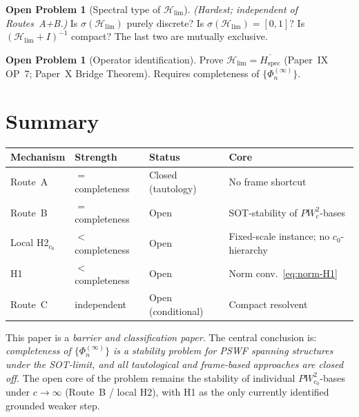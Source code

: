 \documentclass[12pt,a4paper]{amsart}
\theoremstyle{definition}
\newtheorem{problem}[theorem]{Open Problem}
\theoremstyle{remark}
\newcommand{\Hlim}{\mathcal{H}_{\lim}}
\newcommand{\Phiinf}[1]{\Phi_{#1}^{(\infty)}}
\newcommand{\PW}{PW}
\newcommand{\spc}[1]{\sigma(#1)}
\begin{document}
\begin{problem}[Spectral type of $\Hlim$]
\label{prob:spectral-type}
\emph{(Hardest; independent of Routes~A+B.)}
Is $\spc{\Hlim}$ purely discrete?
Is $\spc{\Hlim}=[0,1]$?
Is $(\Hlim+I)^{-1}$ compact?
The last two are mutually exclusive.
\end{problem}

\begin{problem}[Operator identification]
\label{prob:bridge}
Prove $\Hlim = \overline{H_{\mathrm{spec}}}$
(Paper~IX OP~7; Paper~X Bridge Theorem).
Requires completeness of $\{\Phiinf{n}\}$.
\end{problem}

\section{Summary}
\label{sec:summary}

\medskip
\begin{center}
\renewcommand{\arraystretch}{1.3}
\begin{tabular}{lllp{3.5cm}}
\toprule
Mechanism & Strength & Status & Core \\
\midrule
Route~A & $=$ completeness
  & Closed (tautology)
  & No frame shortcut \\
Route~B & $=$ completeness
  & Open
  & SOT-stability of $\PW_c^2$-bases \\
Local H2$_{c_0}$ & $<$ completeness
  & Open
  & Fixed-scale instance; no $c_0$-hierarchy \\
H1 & $<$ completeness
  & Open
  & Norm conv.\ \eqref{eq:norm-H1} \\
Route~C & independent
  & Open (conditional)
  & Compact resolvent \\
\bottomrule
\end{tabular}
\end{center}

\medskip
\noindent
This paper is a \emph{barrier and classification paper}.
The central conclusion is:
\emph{completeness of $\{\Phiinf{n}\}$ is a stability
problem for PSWF spanning structures under the
SOT-limit, and all tautological and frame-based
approaches are closed off.}
The open core of the problem remains the stability
of individual $\PW_{c_0}^2$-bases under
$c\to\infty$ (Route~B / local H2),
with H1 as the only currently identified grounded
weaker step.
\end{document}
